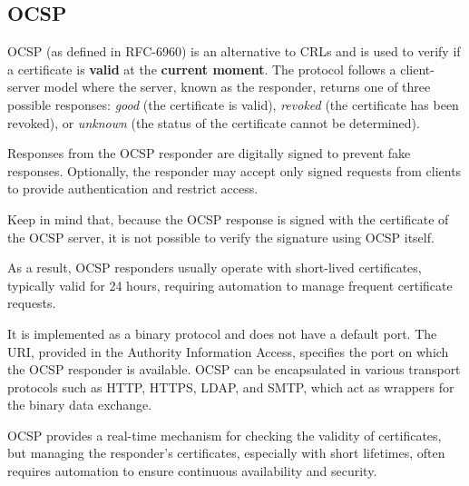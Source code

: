 \subsection{OCSP}
OCSP (as defined in RFC-6960) is an alternative to CRLs and is used to
verify if a certificate is \textbf{valid} at the \textbf{current
moment}. The protocol follows a client-server model where the server,
known as the responder, returns one of three possible responses:
\textit{good} (the certificate is valid), \textit{revoked} (the
certificate has been revoked), or \textit{unknown} (the status of the
certificate cannot be determined).

Responses from the OCSP responder are digitally signed to prevent fake
responses. Optionally, the responder may accept only signed requests
from clients to provide authentication and restrict access.  
\begin{boxH}
  Keep in mind that, because the OCSP response is signed with the
  certificate of the OCSP server, it is not possible to verify the 
  signature using OCSP itself. 
\end{boxH}

As a result, OCSP responders usually operate with short-lived
certificates, typically valid for 24 hours, requiring automation to
manage frequent certificate requests.


It is implemented as a binary protocol and does not have a 
default port. The URI, provided in the Authority Information 
Access, specifies the port on which the OCSP responder is 
available. OCSP can be encapsulated in various transport protocols 
such as HTTP, HTTPS, LDAP, and SMTP, which act as wrappers for the 
binary data exchange.

OCSP provides a real-time mechanism for checking the validity of 
certificates, but managing the responder’s certificates, especially 
with short lifetimes, often requires automation to ensure 
continuous availability and security.


